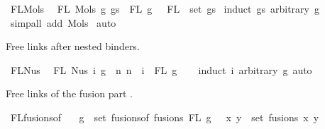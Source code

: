 \begin{isabellebody}
\ FL{\isacharunderscore}{\kern0pt}Mols{}{\isacharcolon}{\kern0pt}\isanewline
\ \ {\isachardoublequoteopen}FL\ {\isacharparenleft}{\kern0pt}Mols{}\ g\ gs{\isacharparenright}{\kern0pt}\ {\isacharequal}{\kern0pt}\ FL\ g\ {\isasymunion}\ {\isasymUnion}\ {\isacharparenleft}{\kern0pt}FL\ {\isacharbackquote}{\kern0pt}\ set\ gs{\isacharparenright}{\kern0pt}{\isachardoublequoteclose}\isanewline
%
\isadelimproof
%
\endisadelimproof
%
\isatagproof
{}\isamarkupfalse%
\ {\isacharparenleft}{\kern0pt}induct\ gs\ arbitrary{\isacharcolon}{\kern0pt}\ g{\isacharparenright}{\kern0pt}\isanewline
{}\isamarkupfalse%
\ {\isacharparenleft}{\kern0pt}simp{\isacharunderscore}{\kern0pt}all\ add{\isacharcolon}{\kern0pt}\ Mols{}{\isacharparenright}{\kern0pt}\isanewline
{}\isamarkupfalse%
\ auto%
\endisatagproof
{\isafoldproof}%
%
\isadelimproof
%
\endisadelimproof
%
\begin{isamarkuptext}%
Free links after  nested  binders.%
\end{isamarkuptext}\isamarkuptrue%
\isamarkupfalse%
\ FL{\isacharunderscore}{\kern0pt}Nus{}{\isacharcolon}{\kern0pt}\isanewline
\ \ {\isachardoublequoteopen}FL\ {\isacharparenleft}{\kern0pt}Nus{}\ i\ g{\isacharparenright}{\kern0pt}\ {\isacharequal}{\kern0pt}\ {\isacharbraceleft}{\kern0pt}n{\isachardot}{\kern0pt}\ n\ {\isacharplus}{\kern0pt}\ i\ {\isasymin}\ FL\ g{\isacharbraceright}{\kern0pt}{\isachardoublequoteclose}\isanewline
%
\isadelimproof
\ \ %
\endisadelimproof
%
\isatagproof
{}\isamarkupfalse%
\ {\isacharparenleft}{\kern0pt}induct\ i\ arbitrary{\isacharcolon}{\kern0pt}\ g{\isacharparenright}{\kern0pt}\ auto%
\endisatagproof
{\isafoldproof}%
%
\isadelimproof
%
\endisadelimproof
%
\begin{isamarkuptext}%
Free links of the fusion part .%
\end{isamarkuptext}\isamarkuptrue%
\isamarkupfalse%
\ FL{\isacharunderscore}{\kern0pt}fusions{\isacharunderscore}{\kern0pt}of{\isacharcolon}{\kern0pt}\isanewline
\ \ {\isachardoublequoteopen}{\isacharparenleft}{\kern0pt}{\isasymUnion}\ g\ {\isasymin}\ set\ {\isacharparenleft}{\kern0pt}fusions{\isacharunderscore}{\kern0pt}of\ fusions{\isacharparenright}{\kern0pt}{\isachardot}{\kern0pt}\ FL\ g{\isacharparenright}{\kern0pt}\ {\isacharequal}{\kern0pt}\ {\isacharparenleft}{\kern0pt}{\isasymUnion}\ {\isacharparenleft}{\kern0pt}x{\isacharcomma}{\kern0pt}\ y{\isacharparenright}{\kern0pt}\ {\isasymin}\ set\ fusions{\isachardot}{\kern0pt}\ {\isacharbraceleft}{\kern0pt}x{\isacharcomma}{\kern0pt}\ y{\isacharbraceright}{\kern0pt}{\isacharparenright}{\kern0pt}{\isachardoublequoteclose}\isanewline

\end{isabellebody}
